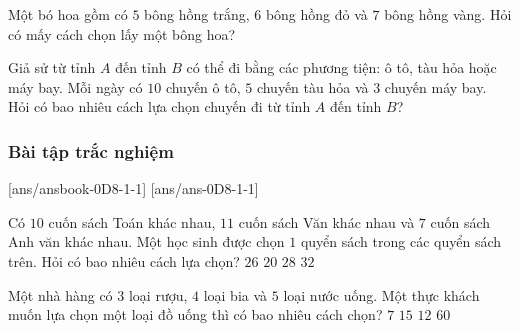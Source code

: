 \begin{bt}%
	Một bó hoa gồm có $5$ bông hồng trắng, $6$ bông hồng đỏ và $7$ bông hồng vàng. Hỏi có mấy cách chọn lấy một bông hoa?  
\end{bt}

\begin{bt}%
	Giả sử từ tỉnh $A$ đến tỉnh $B$ có thể đi bằng các phương tiện: ô tô, tàu hỏa hoặc máy bay. Mỗi ngày có $10$ chuyến ô tô, $5$ chuyến tàu hỏa và $3$ chuyến máy bay. Hỏi có bao nhiêu cách lựa chọn chuyến đi từ tỉnh $A$ đến tỉnh $B$? 
\end{bt}

\subsubsection{Bài tập trắc nghiệm}
[ans/ansbook-0D8-1-1]
[ans/ans-0D8-1-1]
\setcounter{ex}{0}

\begin{ex}%
	Có $10$ cuốn sách Toán khác nhau, $11$ cuốn sách Văn khác nhau và $7$ cuốn sách Anh văn khác nhau. Một học sinh được chọn $1$ quyển sách trong các quyển sách trên. Hỏi có bao nhiêu cách lựa chọn?
	\choice
	{$26$}
	{$20$}
	{\True $28$}
	{$32$}
\end{ex}

\begin{ex}%
	Một nhà hàng có $3$ loại rượu, $4$ loại bia và $5$ loại nước uống. Một thực khách muốn lựa chọn một loại đồ uống thì có bao nhiêu cách chọn?
	\choice
	{$7$}
	{$15$}
	{\True $12$}
	{$60$}
\end{ex}

